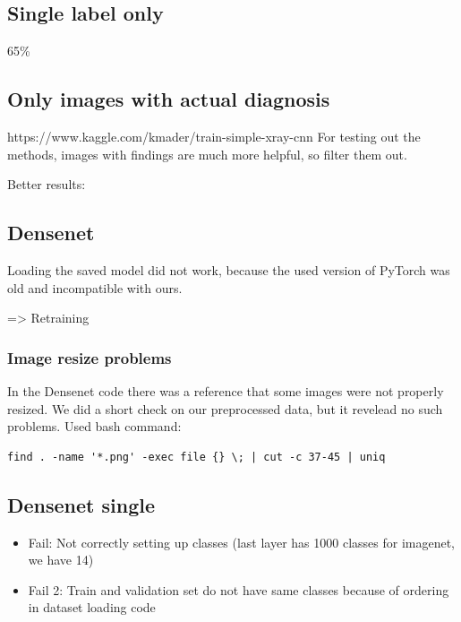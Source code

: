 \subsection{Single label only}
65\%


\subsection{Only images with actual diagnosis}
https://www.kaggle.com/kmader/train-simple-xray-cnn 
For testing out the methods, images with findings are much more helpful, so filter them out.

Better results:

\subsection{Densenet}




Loading the saved model did not work, because the used version of PyTorch was old and incompatible with ours.

=> Retraining

\subsubsection{Image resize problems}
In the Densenet code there was a reference that some images were not properly resized. We did a short check on our preprocessed data, but it revelead no such problems. Used bash command:

\begin{verbatim}
find . -name '*.png' -exec file {} \; | cut -c 37-45 | uniq
\end{verbatim}

\subsection{Densenet single}

\begin{itemize}
    \item Fail: Not correctly setting up classes (last layer has 1000 classes for imagenet, we have 14)
    \item Fail 2: Train and validation set do not have same classes because of ordering in dataset loading code
\end{itemize}

